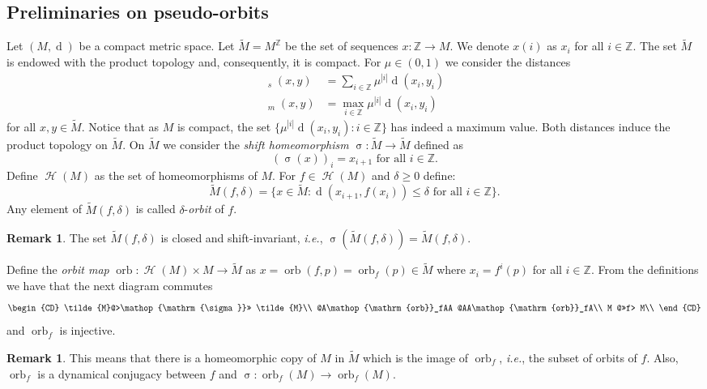 \documentclass[12pt]{amsart}
\DeclareMathOperator{\ho}{\mathcal{H}}
\DeclareMathOperator{\homeo}{\ho}
\DeclareMathOperator{\shift}{\sigma}
\theoremstyle{plain}
\theoremstyle{definition}
\newtheorem{rmk}[thm]{Remark}
\theoremstyle{remark}
\DeclareMathOperator{\dist}{d}
\DeclareMathOperator{\tdist}{\tilde{d}}
\DeclareMathOperator{\orb}{orb}
\newcommand{\Z}{\mathbb Z}
\newcommand{\tM}{\tilde{M}}
\newcommand{\rojo}[1]{\textcolor{red}{#1}}
\begin{document}
\subsection{Preliminaries on pseudo-orbits}
\label{secPrelimPO}
Let $(M,\dist)$ be a compact metric space.
Let $\tM=M^\Z$ be the set of sequences $x\colon \Z\to M$.
We denote $x(i)$ as $x_i$ for all $i\in\Z$.
The set $\tM$ is endowed with the product topology and, consequently, it is compact.
For $\mu\in(0,1)$ we consider the distances
\begin{align*}
\tdist_s(x,y)&=\sum_{i\in\Z} \mu^{|i|}\dist(x_i,y_i)\\
\tdist_m(x,y)&=\max_{i\in\Z} \mu^{|i|}\dist(x_i,y_i)
\end{align*}
for all $x,y\in \tM$.
Notice that as $M$ is compact, the set $\{\mu^{|i|}\dist(x_i,y_i):i\in\Z\}$ has indeed a maximum value.
Both distances induce the product topology on $\tM$.
On $\tM$ we consider the \textit{shift homeomorphism} $\shift\colon \tM\to \tM$
defined as
\begin{equation}
	\label{ecuDefShift}
	(\shift(x))_i=x_{i+1}\text{ for all }i\in\Z.
\end{equation}
Define $\homeo(M)$ as the set of homeomorphisms of $M$.
For $f\in\homeo(M)$ and $\delta\geq 0$ define:
\[
\tM(f,\delta)=\{x\in \tM:\dist(x_{i+1},f(x_i))\leq\delta\text{ for all } i\in\Z\}.
\]
Any element of $\tM(f,\delta)$ is called $\delta$-\textit{orbit} of $f$.
\begin{rmk}
	\label{rmkMdeltaShiftInv}
	The set $\tM(f,\delta)$ is closed and shift-invariant, \textit{i.e.}, $\shift(\tM(f,\delta))=\tM(f,\delta)$.
\end{rmk}

Define the \emph{orbit map} $\orb\colon\homeo(M)\times M\to \tM$ as
$x=\orb(f,p)=\orb_f(p)\in \tM$ where $x_i=f^i(p)$ for all $i\in\Z$.
From the definitions we have that the next diagram commutes
\[
\begin{CD}
	\tM @>\shift>> \tM\\
	@A\orb_fAA @AA\orb_fA\\
	M @>>f> M\\
\end{CD}
\]
and $\orb_f$ is injective.

\begin{rmk}
	\label{rmkOrbSube}
	This means that there is a homeomorphic copy of $M$ in $\tM$ which is the image of $\orb_f$, \textit{i.e.}, the subset of orbits of $f$. Also, $\orb_f$ is
		a dynamical conjugacy between $f$ and $\shift\colon \orb_f(M)\to\orb_f(M)$.
\end{rmk}
\end{document}
